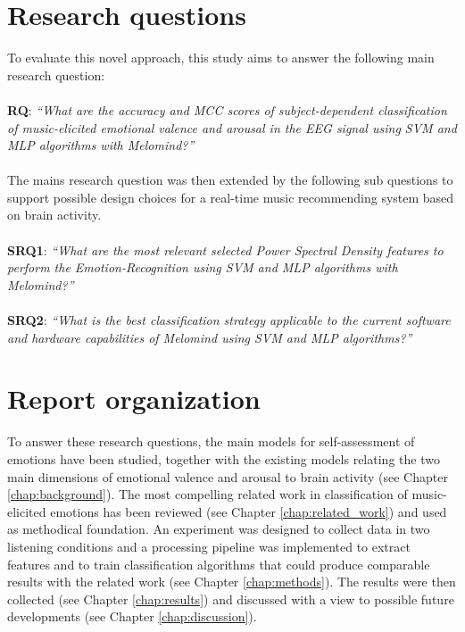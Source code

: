 \section{Research questions}
\label{sec:goal}
To evaluate this novel approach, this study aims to answer the following main research question:
\\
\\
\textbf{RQ}: \emph{ “What are the accuracy and MCC scores of subject-dependent classification of music-elicited emotional valence and arousal in the EEG signal using SVM and MLP algorithms with Melomind?”}
\\
\\
The mains research question was then extended by the following sub questions to support possible design choices for a real-time music recommending system based on brain activity.
\\
\\
\textbf{SRQ1}: \emph{“What are the most relevant selected Power Spectral Density features to perform the Emotion-Recognition using SVM and MLP algorithms with Melomind?”}
\\
\\
\textbf{SRQ2}: \emph{“What is the best classification strategy applicable to the current software and hardware capabilities of Melomind using SVM and MLP algorithms?”}



\section{Report organization}
\label{sec:organization}
To answer these research questions, the main models for self-assessment of emotions have been studied, together with the existing models relating the two main dimensions of emotional valence and arousal to brain activity (see Chapter \ref{chap:background}). The most compelling related work in classification of music-elicited emotions has been reviewed (see Chapter \ref{chap:related_work}) and used as methodical foundation. An experiment was designed to collect data in two listening conditions  and a processing pipeline was implemented to extract features and to train classification algorithms that could produce comparable results with the related work (see Chapter \ref{chap:methods}). The results were then collected (see Chapter \ref{chap:results}) and discussed with a view to possible future developments (see Chapter \ref{chap:discussion}).